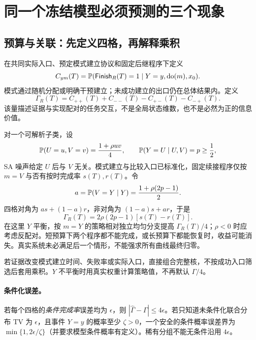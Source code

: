 \documentclass[11pt,a4paper,fontset=fandol]{ctexart}
\theoremstyle{definition}\newtheorem{definition}[theorem]{定义}
\theoremstyle{remark}\newtheorem{remark}[theorem]{说明}
\numberwithin{equation}{section}
\newcommand{\Finish}{\mathsf{Finish}}\newcommand{\ind}{\mathbf 1}
\begin{document}
\section{同一个冻结模型必须预测的三个现象}
\label{sec:predictions}
\subsection{预算与关联：先定义四格，再解释乘积}
在共同实际入口、预定模式建立协议和固定后继程序下定义
\begin{equation}
 C_{ym}(T)=\Prb(\Finish_R(T)=1\mid Y=y,\operatorname{do}(m),x_0).
 \label{eq:four}
\end{equation}
模式通过随机分配或明确干预建立；未成功建立的出口仍在总体结果内。定义
\begin{equation}
 \Gamma_R(T)=C_{++}(T)+C_{--}(T)-C_{+-}(T)-C_{-+}(T).
 \label{eq:gamma}
\end{equation}
该量描述证据与实现配对的任务交互，不是全局状态维数，也不是必然为正的信息价值。

对一个可解析子类，设
\begin{equation}
 \mathbb P(U=u,V=v)=\frac{1+\rho uv}{4},\qquad
 \mathbb P(Y=U\mid U,V)=p\ge\frac12,
 \label{eq:binary}
\end{equation}
SA 噪声给定 $U$ 后与 $V$ 无关。模式建立与比较入口已标准化，固定续接程序仅按 $m=V$ 与否有按时完成率 $s(T),r(T)$。令
\begin{equation}
 a=\mathbb P(V=Y\mid Y)=\frac{1+\rho(2p-1)}2.
\end{equation}
四格对角为 $as+(1-a)r$，非对角为 $(1-a)s+ar$，于是
\begin{equation}
 \boxed{\Gamma_R(T)=2\rho(2p-1)[s(T)-r(T)].}
 \label{eq:factor}
\end{equation}
在这里 $Y$ 平衡，按 $m=Y$ 的策略相对独立均匀分支提高 $\Gamma_R(T)/4$；$\rho<0$ 时应考虑反配对。短预算下两个程序都不能完成，或长预算下都能恢复时，收益可能消失。真实系统未必满足后一个情形，不能强求所有曲线最终归零。

若证据改变模式建立时间、失败率或实际入口，直接组合完整核，不按成功入口筛选后套用乘积。$Y$ 不平衡时用真实权重计算策略值，不再默认 $\Gamma/4$。

\paragraph{条件化误差。}
若每个四格的\emph{条件完成率}误差均为 $\epsilon$，则 $|\widehat\Gamma-\Gamma|\le4\epsilon$。若只知道未条件化联合分布 TV 为 $\epsilon$，且事件 $Y=y$ 的概率至少 $\zeta>0$，一个安全的条件概率误差界为 $\min\{1,2\epsilon/\zeta\}$（并要求模型条件概率有定义）。稀有分组不能无条件沿用 $4\epsilon$。
\end{document}
